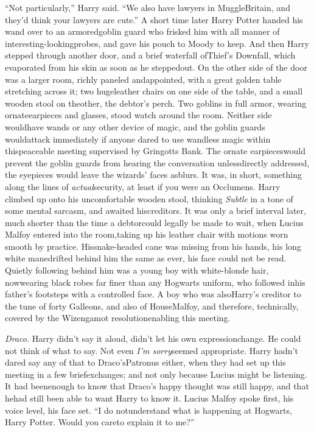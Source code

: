 ``Not particularly,'' Harry said. ``We also have lawyers in MuggleBritain, and they'd think your lawyers are cute.''
A short time later Harry Potter handed his wand over to an armoredgoblin guard who frisked him with all manner of interesting-lookingprobes, and gave his pouch to Moody to keep.
And then Harry stepped through another door, and a brief waterfall ofThief's Downfall, which evaporated from his skin as soon as he steppedout.
On the other side of the door was a larger room, richly paneled andappointed, with a great golden table stretching across it; two hugeleather chairs on one side of the table, and a small wooden stool on theother, the debtor's perch. Two goblins in full armor, wearing ornateearpieces and glasses, stood watch around the room. Neither side wouldhave wands or any other device of magic, and the goblin guards wouldattack immediately if anyone dared to use wandless magic within thispeaceable meeting supervised by Gringotts Bank. The ornate earpieceswould prevent the goblin guards from hearing the conversation unlessdirectly addressed, the eyepieces would leave the wizards' faces asblurs. It was, in short, something along the lines of \emph{actual}security, at least if you were an Occlumens.
Harry climbed up onto his uncomfortable wooden stool, thinking
\emph{Subtle} in a tone of some mental sarcasm, and awaited hiscreditors.
It was only a brief interval later, much shorter than the time a debtorcould legally be made to wait, when Lucius Malfoy entered into the room,taking up his leather chair with motions worn smooth by practice. Hissnake-headed cane was missing from his hands, his long white manedrifted behind him the same as ever, his face could not be read.
Quietly following behind him was a young boy with white-blonde hair, nowwearing black robes far finer than any Hogwarts uniform, who followed inhis father's footsteps with a controlled face. A boy who was alsoHarry's creditor to the tune of forty Galleons, and also of HouseMalfoy, and therefore, technically, covered by the Wizengamot resolutionenabling this meeting.

\emph{Draco.} Harry didn't say it aloud, didn't let his own expressionchange. He could not think of what to say. Not even \emph{I'm sorry}seemed appropriate. Harry hadn't dared say any of that to Draco'sPatronus either, when they had set up this meeting in a few briefexchanges; and not only because Lucius might be listening. It had beenenough to know that Draco's happy thought was still happy, and that hehad still been able to want Harry to know it.
Lucius Malfoy spoke first, his voice level, his face set. ``I do notunderstand what is happening at Hogwarts, Harry Potter. Would you careto explain it to me?''

